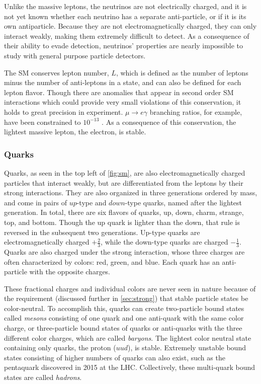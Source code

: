 Unlike the massive leptons, the neutrinos are not electrically charged, and it is not yet known whether each neutrino has a separate anti-particle, or if it is its own antiparticle. Because they are not electromagnetically charged, they can only interact weakly, making them extremely difficult to detect. As a consequence of their ability to evade detection, neutrinos' properties are nearly impossible to study with general purpose particle detectors. 

The \ac{SM} conserves lepton number, $L$, which is defined as the number of leptons minus the number of anti-leptons in a state, and can also be defined for each lepton flavor. Though there are anomalies that appear in second order \ac{SM} interactions which could provide very small violations of this conservation, it holds to great precision in experiment. $\mu \rightarrow e\gamma$ branching ratios, for example, have been constrained to $10^{-13}$ \cite{1605.05081}. As a consequence of this conservation, the lightest massive lepton, the electron, is stable.

\subsubsection{Quarks}
\label{sec:quarks}

Quarks, as seen in the top left of \autoref{fig:sm}, are also electromagnetically charged particles that interact weakly, but are differentiated from the leptons by their strong interactions. They are also organized in three generations ordered by mass, and come in pairs of $up$-type and $down$-type quarks, named after the lightest generation. In total, there are six flavors of quarks, up, down, charm, strange, top, and bottom. Though the up quark is lighter than the down, that rule is reversed in the subsequent two generations. Up-type quarks are electromagnetically charged $+\frac{2}{3}$, while the down-type quarks are charged $-\frac{1}{3}$. Quarks are also charged under the strong interaction, whose three charges are often characterized by colors: red, green, and blue. Each quark has an anti-particle with the opposite charges. 

These fractional charges and individual colors are never seen in nature because of the requirement (discussed further in \autoref{sec:strong}) that stable particle states be color-neutral. To accomplish this, quarks can create two-particle bound states called \textit{mesons} consisting of one quark and one anti-quark with the same color charge, or three-particle bound states of quarks or anti-quarks with the three different color charges, which are called \textit{baryons}. The lightest color neutral state containing only quarks, the proton ($uud$), is stable. Extremely unstable bound states consisting of higher numbers of quarks can also exist, such as the pentaquark discovered in 2015 at the \ac{LHC}. \cite{Pentaquark} Collectively, these multi-quark bound states are called \textit{hadrons}. 


